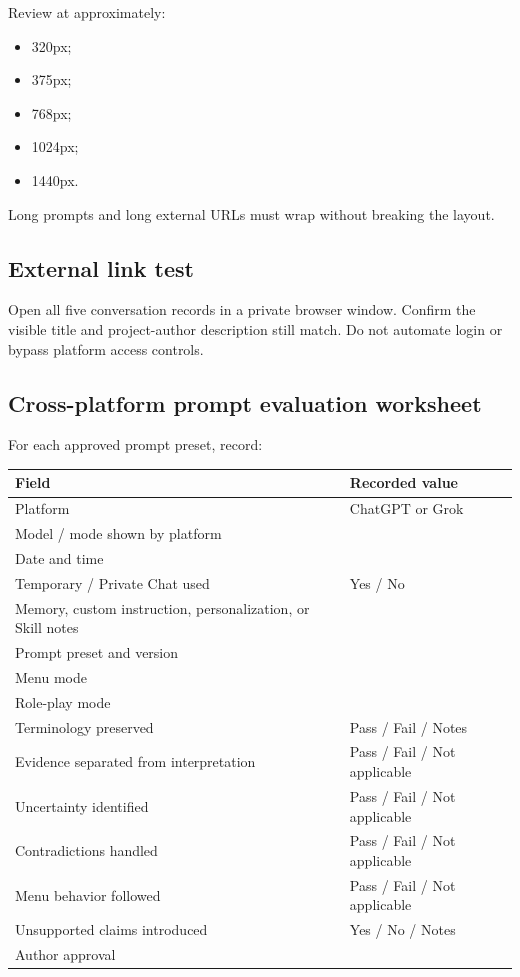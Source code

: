 \documentclass[11pt,letterpaper]{article}
\begin{document}
Review at approximately:

\begin{itemize}
    \item 320px;
    \item 375px;
    \item 768px;
    \item 1024px;
    \item 1440px.
\end{itemize}

Long prompts and long external URLs must wrap without breaking the layout.

\subsection{External link test}

Open all five conversation records in a private browser window. Confirm the
visible title and project-author description still match. Do not automate login
or bypass platform access controls.

\subsection{Cross-platform prompt evaluation worksheet}

For each approved prompt preset, record:

\begin{longtable}{L{1.7in}L{4.8in}}
\toprule
\textbf{Field} & \textbf{Recorded value} \\
\midrule
\endhead
Platform & ChatGPT or Grok \\
Model / mode shown by platform &  \\
Date and time &  \\
Temporary / Private Chat used & Yes / No \\
Memory, custom instruction, personalization, or Skill notes &  \\
Prompt preset and version &  \\
Menu mode &  \\
Role-play mode &  \\
Terminology preserved & Pass / Fail / Notes \\
Evidence separated from interpretation & Pass / Fail / Not applicable \\
Uncertainty identified & Pass / Fail / Not applicable \\
Contradictions handled & Pass / Fail / Not applicable \\
Menu behavior followed & Pass / Fail / Not applicable \\
Unsupported claims introduced & Yes / No / Notes \\
Author approval &  \\
\bottomrule
\end{longtable}
\end{document}
